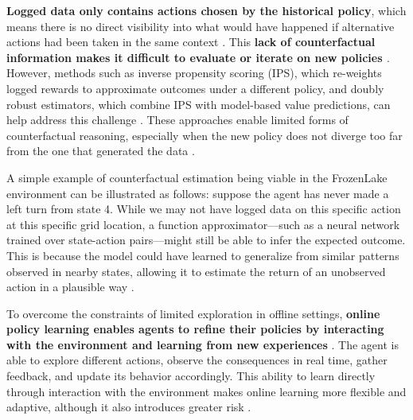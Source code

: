 \documentclass[final]{anthology-ch}         %
\begin{document}
\textbf{Logged data only contains actions chosen by the historical policy}, which means there is no direct visibility into what would have happened if alternative actions had been taken in the same context \cite{swaminathan2015counterfactual}. This \textbf{lack of counterfactual information makes it difficult to evaluate or iterate on new policies \cite{dudik2011doubly}}. However, methods such as inverse propensity scoring (IPS), which re-weights logged rewards to approximate outcomes under a different policy, and doubly robust estimators, which combine IPS with model-based value predictions, can help address this challenge \cite{swaminathan2015counterfactual, dudik2011doubly, levine2020offline}. These approaches enable limited forms of counterfactual reasoning, especially when the new policy does not diverge too far from the one that generated the data \cite{swaminathan2015counterfactual, dudik2011doubly}. 

A simple example of counterfactual estimation being viable in the FrozenLake environment can be illustrated as follows: suppose the agent has never made a left turn from state 4. While we may not have logged data on this specific action at this specific grid location, a function approximator—such as a neural network trained over state-action pairs—might still be able to infer the expected outcome. This is because the model could have learned to generalize from similar patterns observed in nearby states, allowing it to estimate the return of an unobserved action in a plausible way \cite{levine2020offline, dudik2011doubly}.

To overcome the constraints of limited exploration in offline settings, \textbf{online policy learning enables agents to refine their policies by interacting with the environment and learning from new experiences} \cite{dimitrakakis2018decision}. The agent is able to explore different actions, observe the consequences in real time, gather feedback, and update its behavior accordingly. This ability to learn directly through interaction with the environment makes online learning more flexible and adaptive, although it also introduces greater risk \cite{dulac2019challenges}. 
\end{document}
